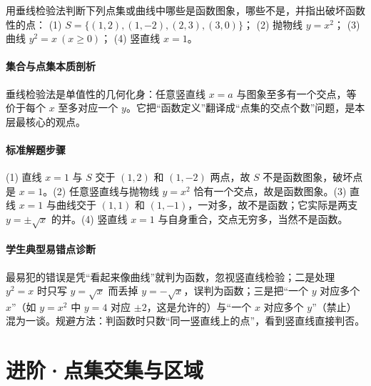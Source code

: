 \begin{problem}
用垂线检验法判断下列点集或曲线中哪些是函数图象，哪些不是，并指出破坏函数性的点：
(1) $S=\{(1,2),(1,-2),(2,3),(3,0)\}$；
(2) 抛物线 $y=x^2$；
(3) 曲线 $y^2=x\ (x\geq0)$；
(4) 竖直线 $x=1$。
\end{problem}
\begin{solution}
\paragraph{集合与点集本质剖析}
垂线检验法是单值性的几何化身：任意竖直线 $x=a$ 与图象至多有一个交点，等价于每个 $x$ 至多对应一个 $y$。它把“函数定义”翻译成“点集的交点个数”问题，是本层最核心的观点。
\paragraph{标准解题步骤}
(1) 直线 $x=1$ 与 $S$ 交于 $(1,2)$ 和 $(1,-2)$ 两点，故 $S$ 不是函数图象，破坏点是 $x=1$。(2) 任意竖直线与抛物线 $y=x^2$ 恰有一个交点，故是函数图象。(3) 直线 $x=1$ 与曲线交于 $(1,1)$ 和 $(1,-1)$，一对多，故不是函数；它实际是两支 $y=\pm\sqrt{x}$ 的并。(4) 竖直线 $x=1$ 与自身重合，交点无穷多，当然不是函数。
\paragraph{学生典型易错点诊断}
最易犯的错误是凭“看起来像曲线”就判为函数，忽视竖直线检验；二是处理 $y^2=x$ 时只写 $y=\sqrt{x}$ 而丢掉 $y=-\sqrt{x}$，误判为函数；三是把“一个 $y$ 对应多个 $x$”（如 $y=x^2$ 中 $y=4$ 对应 $\pm2$，这是允许的）与“一个 $x$ 对应多个 $y$”（禁止）混为一谈。规避方法：判函数时只数“同一竖直线上的点”，看到竖直线直接判否。
\end{solution}

\section{进阶·点集交集与区域}

